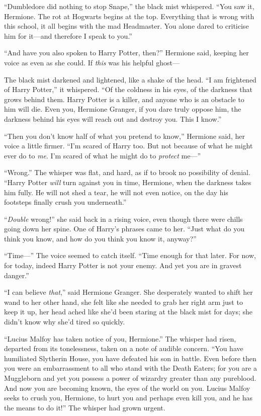 “Dumbledore did nothing to stop Snape,” the black mist whispered. “You saw it, Hermione. The rot at Hogwarts begins at the top. Everything that is wrong with this school, it all begins with the mad Headmaster. You alone dared to criticise him for it—and therefore I speak to you.”

“And have you also spoken to Harry Potter, then?” Hermione said, keeping her voice as even as she could. If \emph{this} was his helpful ghost—

The black mist darkened and lightened, like a shake of the head. “I am frightened of Harry Potter,” it whispered. “Of the coldness in his eyes, of the darkness that grows behind them. Harry Potter is a killer, and anyone who is an obstacle to him will die. Even you, Hermione Granger, if you dare truly oppose him, the darkness behind his eyes will reach out and destroy you. This I know.”

“Then you don’t know half of what you pretend to know,” Hermione said, her voice a little firmer. “I’m scared of Harry too. But not because of what he might ever do to \emph{me}. I’m scared of what he might do to \emph{protect} me—”

“Wrong.” The whisper was flat, and hard, as if to brook no possibility of denial. “Harry Potter \emph{will} turn against you in time, Hermione, when the darkness takes him fully. He will not shed a tear, he will not even notice, on the day his footsteps finally crush you underneath.”

“\emph{Double} wrong!” she said back in a rising voice, even though there were chills going down her spine. One of Harry’s phrases came to her. “Just what do you think you know, and how do you think you know it, anyway?”

“Time—” The voice seemed to catch itself. “Time enough for that later. For now, for today, indeed Harry Potter is not your enemy. And yet you are in gravest danger.”

“I can believe \emph{that},” said Hermione Granger. She desperately wanted to shift her wand to her other hand, she felt like she needed to grab her right arm just to keep it up, her head ached like she’d been staring at the black mist for days; she didn’t know why she’d tired so quickly.

“Lucius Malfoy has taken notice of you, Hermione.” The whisper had risen, departed from its tonelessness, taken on a note of audible concern. “You have humiliated Slytherin House, you have defeated his son in battle. Even before then you were an embarrassment to all who stand with the Death Eaters; for you are a Muggleborn and yet you possess a power of wizardry greater than any pureblood. And now you are becoming known, the eyes of the world on you. Lucius Malfoy seeks to crush you, Hermione, to hurt you and perhaps even kill you, and he has the means to do it!” The whisper had grown urgent.

